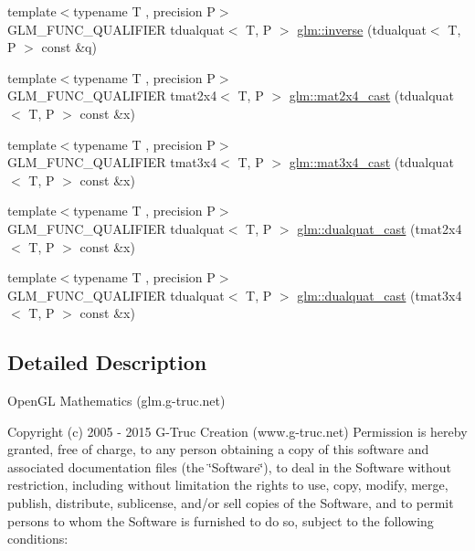 \begin{DoxyCompactItemize}
{\footnotesize template$<$typename T , precision P$>$ }\\G\+L\+M\+\_\+\+F\+U\+N\+C\+\_\+\+Q\+U\+A\+L\+I\+F\+I\+E\+R tdualquat$<$ T, P $>$ \hyperlink{group__gtx__dual__quaternion_ga2149d3cb8af04d9530de0cd16aa1aab2}{glm\+::inverse} (tdualquat$<$ T, P $>$ const \&q)
\item 
{\footnotesize template$<$typename T , precision P$>$ }\\G\+L\+M\+\_\+\+F\+U\+N\+C\+\_\+\+Q\+U\+A\+L\+I\+F\+I\+E\+R tmat2x4$<$ T, P $>$ \hyperlink{group__gtx__dual__quaternion_ga2d124748183e12db8288eeaca350298e}{glm\+::mat2x4\+\_\+cast} (tdualquat$<$ T, P $>$ const \&x)
\item 
{\footnotesize template$<$typename T , precision P$>$ }\\G\+L\+M\+\_\+\+F\+U\+N\+C\+\_\+\+Q\+U\+A\+L\+I\+F\+I\+E\+R tmat3x4$<$ T, P $>$ \hyperlink{group__gtx__dual__quaternion_ga576745d979e3c079a64152490c816954}{glm\+::mat3x4\+\_\+cast} (tdualquat$<$ T, P $>$ const \&x)
\item 
{\footnotesize template$<$typename T , precision P$>$ }\\G\+L\+M\+\_\+\+F\+U\+N\+C\+\_\+\+Q\+U\+A\+L\+I\+F\+I\+E\+R tdualquat$<$ T, P $>$ \hyperlink{group__gtx__dual__quaternion_gada9799afe2b62394dc498534beb5bc78}{glm\+::dualquat\+\_\+cast} (tmat2x4$<$ T, P $>$ const \&x)
\item 
{\footnotesize template$<$typename T , precision P$>$ }\\G\+L\+M\+\_\+\+F\+U\+N\+C\+\_\+\+Q\+U\+A\+L\+I\+F\+I\+E\+R tdualquat$<$ T, P $>$ \hyperlink{group__gtx__dual__quaternion_ga20eb5758beb73cc6dbc2d9104f03ec20}{glm\+::dualquat\+\_\+cast} (tmat3x4$<$ T, P $>$ const \&x)
\end{DoxyCompactItemize}


\subsection{Detailed Description}
Open\+G\+L Mathematics (glm.\+g-\/truc.\+net)

Copyright (c) 2005 -\/ 2015 G-\/\+Truc Creation (www.\+g-\/truc.\+net) Permission is hereby granted, free of charge, to any person obtaining a copy of this software and associated documentation files (the \char`\"{}\+Software\char`\"{}), to deal in the Software without restriction, including without limitation the rights to use, copy, modify, merge, publish, distribute, sublicense, and/or sell copies of the Software, and to permit persons to whom the Software is furnished to do so, subject to the following conditions\+:

